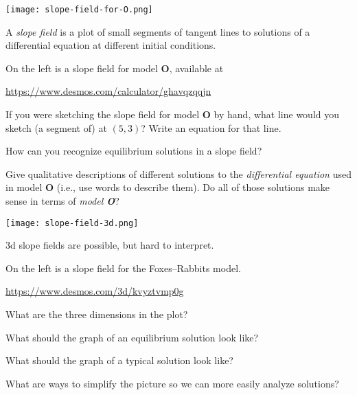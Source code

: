 \documentclass{workbook}
\begin{document}
\begin{slide}

	\question
	
	\begin{center}
	\texttt{[image: slope-field-for-O.png]}
	\end{center}

	A \emph{slope field} is a plot of small segments of tangent lines
	to solutions of a differential equation at different initial conditions.
	
	On the left is a slope field for model \textbf{O}, available at

	\url{https://www.desmos.com/calculator/ghavqzqqjn}

	\begin{parts}
		\item If you were sketching the slope field for model \textbf{O} by hand, what line would you sketch
		(a segment of) at $(5,3)$? Write an equation for that line.
		\item How can you recognize equilibrium solutions in a slope field?
		\item Give qualitative descriptions of different solutions to the \emph{differential equation} used in model \textbf{O} (i.e., use words to describe them). Do all
		of those solutions make sense in terms of \emph{model \textbf{O}}?
	\end{parts}
\end{slide}

\begin{slide}

	\question
	
	\begin{center}
		\texttt{[image: slope-field-3d.png]}
	\end{center}

	3d slope fields are possible, but hard to interpret.

	On the left is a slope field for the Foxes--Rabbits model.

	\url{https://www.desmos.com/3d/kvyztvmp0g}

	\begin{parts}
		\item What are the three dimensions in the plot?
		\item What should the graph of an equilibrium solution look like?
		\item What should the graph of a typical solution look like?
		\item What are ways to simplify the picture so we can more easily analyze solutions?
	\end{parts}
\end{slide}
\end{document}
